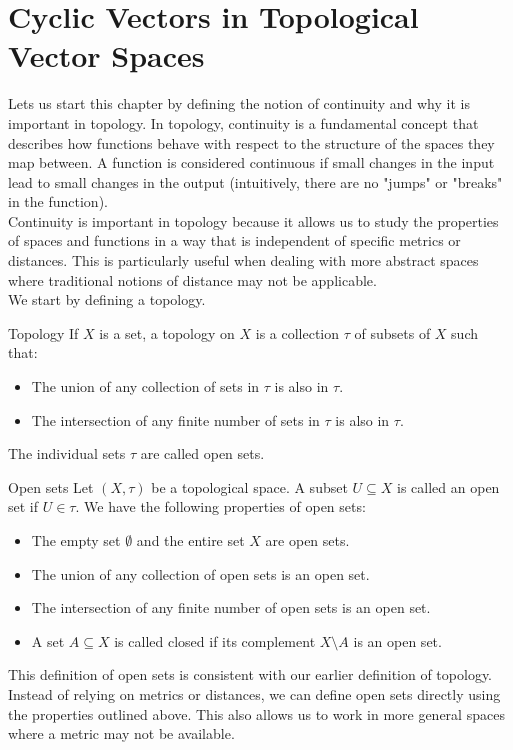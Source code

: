 \documentclass[openany]{book}
\begin{document}
\section{Cyclic Vectors in Topological Vector Spaces}
Lets us start this chapter by defining the notion of continuity and why it is important in topology. In topology, continuity is a fundamental concept that describes how functions behave with respect to the structure of the spaces they map between. A function is considered continuous if small changes in the input lead to small changes in the output (intuitively, there are no "jumps" or "breaks" in the function). \\
Continuity is important in topology because it allows us to study the properties of spaces and functions in a way that is independent of specific metrics or distances. This is particularly useful when dealing with more abstract spaces where traditional notions of distance may not be applicable. \\
We start by defining a topology. \cite{Simmons}
\begin{mydefinition}{Topology}
    If $X$ is a set, a topology on $X$ is a collection $\tau$ of subsets of $X$ such that:
    \begin{itemize}
        \item The union of any collection of sets in $\tau$ is also in $\tau$.
        \item The intersection of any finite number of sets in $\tau$ is also in $\tau$.
    \end{itemize}
\end{mydefinition}
The individual sets $\tau$ are called open sets. 
\begin{mydefinition}{Open sets}
    Let $(X, \tau)$ be a topological space. A subset $U \subseteq X$ is called an open set if $U \in \tau$. We have the following properties of open sets:
    \begin{itemize}
        \item The empty set $\emptyset$ and the entire set $X$ are open sets.
        \item The union of any collection of open sets is an open set.
        \item The intersection of any finite number of open sets is an open set.
        \item A set $A \subseteq X$ is called closed if its complement $X \setminus A$ is an open set.
    \end{itemize}
\end{mydefinition}
This definition of open sets is consistent with our earlier definition of topology. Instead of relying on metrics or distances, we can define open sets directly using the properties outlined above. This also allows us to work in more general spaces where a metric may not be available. \cite{Simmons} \\
\end{document}
